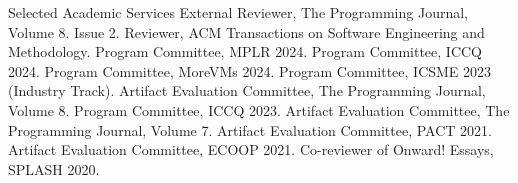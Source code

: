 \begin{rubric}{Selected Academic Services}
  \entry*[2024] External Reviewer, The Programming Journal, Volume 8. Issue 2.
  \entry*[2024] Reviewer, ACM Transactions on Software Engineering and Methodology.
  \entry*[2024] Program Committee, MPLR 2024.
  \entry*[2024] Program Committee, ICCQ 2024.
  \entry*[2024] Program Committee, MoreVMs 2024.
  \entry*[2023] Program Committee, ICSME 2023 (Industry Track).
  \entry*[2023] Artifact Evaluation Committee, The Programming Journal, Volume 8.
  \entry*[2023] Program Committee, ICCQ 2023.
  \entry*[2022] Artifact Evaluation Committee, The Programming Journal, Volume 7.
  \entry*[2021] Artifact Evaluation Committee, PACT 2021.
  \entry*[2021] Artifact Evaluation Committee, ECOOP 2021.
  \entry*[2020] Co-reviewer of Onward! Essays, SPLASH 2020.
\end{rubric}
